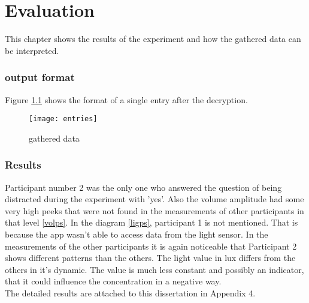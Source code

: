 \chapter{Evaluation}
This chapter shows the results of the experiment and how the gathered data can be interpreted. 

\subsection{output format}
Figure \ref{entries} shows the format of a single entry after the decryption. 

\begin{figure}[!htb]
\centering
\texttt{[image: entries]}
\caption{gathered data}\label{entries}
\vspace{10 mm}
\end{figure}

\FloatBarrier

\subsection{Results}
Participant number 2 was the only one who answered the question of being distracted during the experiment with 'yes'. Also the volume amplitude had some very high peeks that were not found in the measurements of other participants in that level \ref{volps}. 
\bigbreak
In the diagram \ref{ligps}, participant 1 is not mentioned. That is because the app wasn't able to access data from the light sensor. In the  measurements of the other participants it is again noticeable that Participant 2 shows different patterns than the others. The light value in lux differs from the others in it's dynamic. The value is much less constant and possibly an indicator, that it could influence the concentration in a negative way.\\
The detailed results are attached to this dissertation in Appendix 4.

